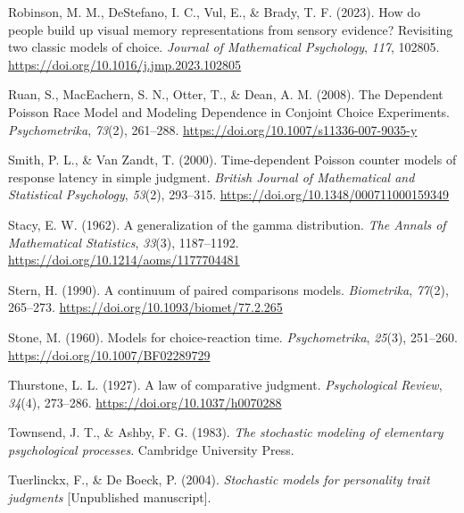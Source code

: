 \documentclass[
  man,
  floatsintext,
  longtable,
  a4paper,
  nolmodern,
  notxfonts,
  notimes,
  colorlinks=true,linkcolor=blue,citecolor=blue,urlcolor=blue]{apa7}
\newlength{\cslhangindent}
\newenvironment{CSLReferences}[2] %
 {\begin{list}{}{%
  \setlength{\itemindent}{0pt}
  \setlength{\leftmargin}{0pt}
  \setlength{\parsep}{0pt}
  \ifodd #1
   \setlength{\leftmargin}{\cslhangindent}
   \setlength{\itemindent}{-1\cslhangindent}
  \fi
  \setlength{\itemsep}{#2\baselineskip}}}
 {\end{list}}
\begin{document}
\begin{CSLReferences}{1}{0}
Robinson, M. M., DeStefano, I. C., Vul, E., \& Brady, T. F. (2023). How
do people build up visual memory representations from sensory evidence?
{Revisiting} two classic models of choice. \emph{Journal of Mathematical
Psychology}, \emph{117}, 102805.
\url{https://doi.org/10.1016/j.jmp.2023.102805}

Ruan, S., MacEachern, S. N., Otter, T., \& Dean, A. M. (2008). The
{Dependent Poisson Race Model} and {Modeling Dependence} in {Conjoint
Choice Experiments}. \emph{Psychometrika}, \emph{73}(2), 261--288.
\url{https://doi.org/10.1007/s11336-007-9035-y}

Smith, P. L., \& Van Zandt, T. (2000). Time-dependent {Poisson} counter
models of response latency in simple judgment. \emph{British Journal of
Mathematical and Statistical Psychology}, \emph{53}(2), 293--315.
\url{https://doi.org/10.1348/000711000159349}

Stacy, E. W. (1962). A generalization of the gamma distribution.
\emph{The Annals of Mathematical Statistics}, \emph{33}(3), 1187--1192.
\url{https://doi.org/10.1214/aoms/1177704481}

Stern, H. (1990). A continuum of paired comparisons models.
\emph{Biometrika}, \emph{77}(2), 265--273.
\url{https://doi.org/10.1093/biomet/77.2.265}

Stone, M. (1960). Models for choice-reaction time. \emph{Psychometrika},
\emph{25}(3), 251--260. \url{https://doi.org/10.1007/BF02289729}

Thurstone, L. L. (1927). A law of comparative judgment.
\emph{Psychological Review}, \emph{34}(4), 273--286.
\url{https://doi.org/10.1037/h0070288}

Townsend, J. T., \& Ashby, F. G. (1983). \emph{The stochastic modeling
of elementary psychological processes}. Cambridge University Press.

Tuerlinckx, F., \& De Boeck, P. (2004). \emph{Stochastic models for
personality trait judgments} {[}Unpublished manuscript{]}.


\end{CSLReferences}
\end{document}
